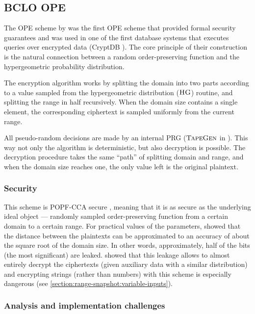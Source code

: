 \subsection{BCLO OPE}

	The OPE scheme by \textcite{bclo-ope} was the first OPE scheme that provided formal security guarantees and was used in one of the first database systems that executes queries over encrypted data (CryptDB \cite{crypt-db}).
 	The core principle of their construction is the natural connection between a random order-preserving function and the hypergeometric probability distribution.

	The encryption algorithm works by splitting the domain into two parts according to a value sampled from the hypergeometric distribution ($\textsc{HG}$) routine, and splitting the range in half recursively.
	When the domain size contains a single element, the corresponding ciphertext is sampled uniformly from the current range.

	All pseudo-random decisions are made by an internal PRG ($\textsc{TapeGen}$ in \cite{bclo-ope}).
	This way not only the algorithm is deterministic, but also decryption is possible.
	The decryption procedure takes the same ``path'' of splitting domain and range, and when the domain size reaches one, the only value left is the original plaintext.

	\subsubsection{Security}
		This scheme is POPF-CCA secure \cite{bclo-ope}, meaning that it is as secure as the underlying ideal object --- randomly sampled order-preserving function from a certain domain to a certain range.
		For practical values of the parameters, \textcite{ope-leakage} showed that the distance between the plaintexts can be approximated to an accuracy of about the square root of the domain size.
		In other words, approximately, half of the bits (the most significant) are leaked.
		\textcite{leakage-abuse-grubs-2017} showed that this leakage allows to almost entirely decrypt the ciphertexts (given auxiliary data with a similar distribution) and encrypting strings (rather than numbers) with this scheme is especially dangerous (see \cref{section:range-snapshot:variable-inputs}).

	\subsubsection{Analysis and implementation challenges}

